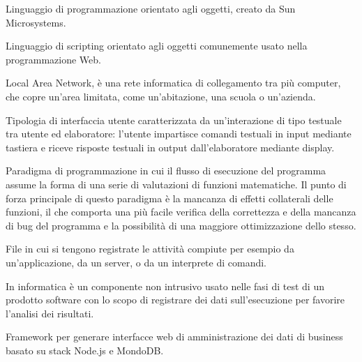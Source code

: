 Linguaggio di programmazione orientato agli oggetti, creato da Sun Microsystems. \\


Linguaggio di scripting orientato agli oggetti comunemente usato nella programmazione Web. \\



Local Area Network, è una rete informatica di collegamento tra più computer, che copre un'area limitata, come un'abitazione, una scuola o un'azienda. \\


Tipologia di interfaccia utente caratterizzata da un'interazione di tipo testuale tra utente ed elaboratore: l'utente impartisce comandi testuali in input mediante tastiera e riceve risposte testuali in output dall'elaboratore mediante display. \\


Paradigma di programmazione in cui il flusso di esecuzione del programma assume la forma di una serie di valutazioni di funzioni matematiche. Il punto di forza principale di questo paradigma è la mancanza di effetti collaterali delle funzioni, il che comporta una più facile verifica della correttezza e della mancanza di bug del programma e la possibilità di una maggiore ottimizzazione dello stesso. \\





File in cui si tengono registrate le attività compiute per esempio da un'applicazione, da un server, o da un interprete di comandi. \\


In informatica è un componente non intrusivo usato nelle fasi di test di un prodotto software con lo scopo di registrare dei dati sull'esecuzione per favorire l'analisi dei risultati. \\



Framework per generare interfacce web di amministrazione dei dati di business basato su stack Node.js e MondoDB. \\

